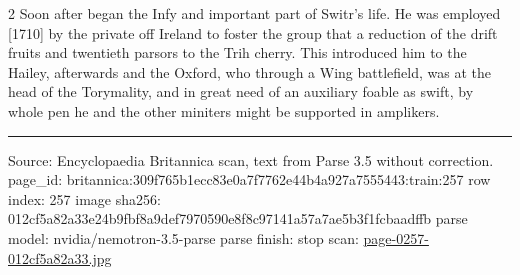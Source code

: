 \documentclass[10pt]{article}
\begin{document}
\begin{multicols}{2}
Soon after began the Infy and important part of Switr’s life. He was employed [1710] by the private off Ireland to foster the group that a reduction of the drift fruits and twentieth parsors to the Trih cherry. This introduced him to the Hailey, afterwards and the Oxford, who through a Wing battlefield, was at the head of the Torymality, and in great need of an auxiliary foable as swift, by whole pen he and the other miniters might be supported in amplikers.

\end{multicols}
\vfill\par\noindent\rule{\linewidth}{0.4pt}\par
{\scriptsize\color{gray}\noindent Source: Encyclopaedia Britannica scan, text from Parse 3.5 without correction. page\_id: britannica:309f765b1ecc83e0a7f7762e44b4a927a7555443:train:257 \quad row index: 257 \quad image sha256: 012cf5a82a33e24b9fbf8a9def7970590e8f8c97141a57a7ae5b3f1fcbaadffb \quad parse model: nvidia/nemotron-3.5-parse \quad parse finish: stop \quad scan: \href{../scans/page-0257-012cf5a82a33.jpg}{page-0257-012cf5a82a33.jpg}\par}
\end{document}
